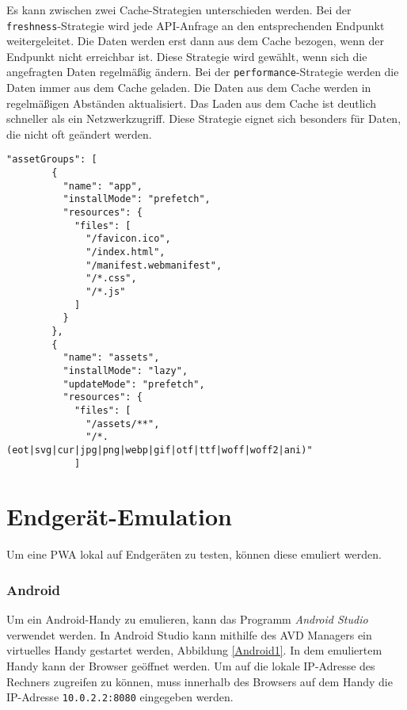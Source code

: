 Es kann zwischen zwei Cache-Strategien unterschieden werden.
Bei der \texttt{freshness}-Strategie wird jede API-Anfrage an den entsprechenden Endpunkt weitergeleitet. 
Die Daten werden erst dann aus dem Cache bezogen, wenn der Endpunkt nicht erreichbar ist. Diese Strategie wird gewählt, wenn sich die angefragten Daten regelmäßig ändern. 
Bei der \texttt{performance}-Strategie werden die Daten immer aus dem Cache geladen. Die Daten aus dem Cache werden in regelmäßigen Abständen aktualisiert. Das Laden aus dem Cache ist deutlich schneller als ein Netzwerkzugriff. Diese Strategie eignet sich besonders für Daten, die nicht oft geändert werden. 

\begin{lstlisting}[caption={Angular \textit{ngsw-config.json}-Datei zur Angabe der Ressourcen, die durch den Service Worker in den Cache gespeichert werden sollen}, label=lst:ngswConfig, float=!htb ]
    "assetGroups": [
        {
          "name": "app",
          "installMode": "prefetch",
          "resources": {
            "files": [
              "/favicon.ico",
              "/index.html",
              "/manifest.webmanifest",
              "/*.css",
              "/*.js"
            ]
          }
        },
        {
          "name": "assets",
          "installMode": "lazy",
          "updateMode": "prefetch",
          "resources": {
            "files": [
              "/assets/**",
              "/*.(eot|svg|cur|jpg|png|webp|gif|otf|ttf|woff|woff2|ani)"
            ] 
\end{lstlisting}






\section{Endgerät-Emulation}

Um eine PWA lokal auf Endgeräten zu testen, können diese emuliert werden.   

\subsubsection{Android}
Um ein Android-Handy zu emulieren, kann das Programm \textit{Android Studio} verwendet werden. In Android Studio kann mithilfe des \ac{AVD Managers} ein virtuelles Handy gestartet werden, Abbildung \ref{Android1}. In dem emuliertem Handy kann der Browser geöffnet werden. Um auf die lokale IP-Adresse des Rechners zugreifen zu können, muss innerhalb des Browsers auf dem Handy die IP-Adresse \texttt{10.0.2.2:8080} eingegeben werden. 

